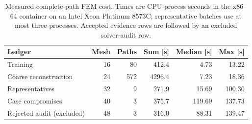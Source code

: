 \begin{table}[H]
\centering
\caption{Measured complete-path FEM cost. Times are CPU-process seconds in the x86--64 container on an Intel Xeon Platinum 8573C; representative batches use at most three processes. Accepted evidence rows are followed by an excluded solver-audit row.}
\label{tab:runtime_summary_fast}
\begin{tabular}{lrrrrr}
\toprule
Ledger & Mesh & Paths & Sum [s] & Median [s] & Max [s] \\
\midrule
Training & 16 & 80 & 412.4 & 4.73 & 13.22 \\
Coarse reconstruction & 24 & 572 & 4296.4 & 7.23 & 18.36 \\
Representatives & 32 & 9 & 271.9 & 15.69 & 100.30 \\
Case compromises & 40 & 3 & 375.7 & 119.69 & 137.73 \\
Rejected audit (excluded) & 48 & 3 & 316.0 & 88.31 & 139.47 \\
\bottomrule
\end{tabular}
\end{table}
